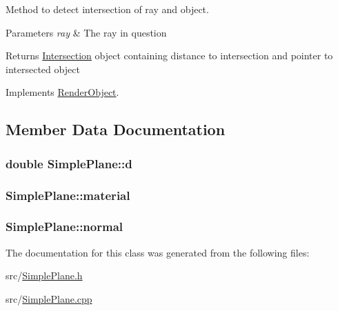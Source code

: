 Method to detect intersection of ray and object. 


\begin{DoxyParams}{Parameters}
{\em ray} & The ray in question \\
\hline
\end{DoxyParams}
\begin{DoxyReturn}{Returns}
\hyperlink{classIntersection}{Intersection} object containing distance to intersection and pointer to intersected object 
\end{DoxyReturn}


Implements \hyperlink{classRenderObject_a681f6674d94f16c4df69605d5e42d05c}{Render\+Object}.



\subsection{Member Data Documentation}
\subsubsection[{\texorpdfstring{d}{d}}]{\setlength{\rightskip}{0pt plus 5cm}double Simple\+Plane\+::d\hspace{0.3cm}{\ttfamily [private]}}\hypertarget{classSimplePlane_a84850a97b34a8616c7ffdd51c30a5dc9}{}\label{classSimplePlane_a84850a97b34a8616c7ffdd51c30a5dc9}
\subsubsection[{\texorpdfstring{material}{material}}]{ Simple\+Plane\+::material\hspace{0.3cm}{\ttfamily [private]}}\hypertarget{classSimplePlane_a04307eae806daa2cd2f1c471224b44cf}{}\label{classSimplePlane_a04307eae806daa2cd2f1c471224b44cf}
\subsubsection[{\texorpdfstring{normal}{normal}}]{ Simple\+Plane\+::normal\hspace{0.3cm}{\ttfamily [private]}}\hypertarget{classSimplePlane_a222f5d12aed966bc2764abc90b622037}{}\label{classSimplePlane_a222f5d12aed966bc2764abc90b622037}


The documentation for this class was generated from the following files\+:\begin{DoxyCompactItemize}
\item 
src/\hyperlink{SimplePlane_8h}{Simple\+Plane.\+h}\item 
src/\hyperlink{SimplePlane_8cpp}{Simple\+Plane.\+cpp}\end{DoxyCompactItemize}
